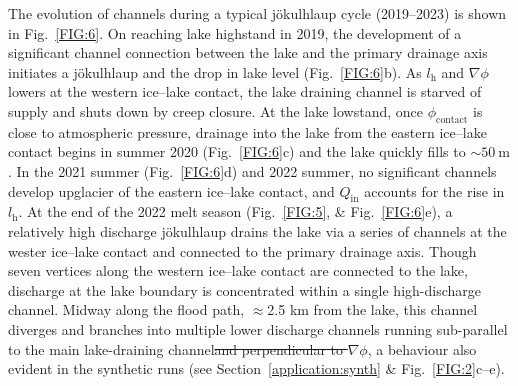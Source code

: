 \documentclass[tc, manuscript]{copernicus}
\providecommand{\DIFdel}[1]{{\protect\color{red}\sout{#1}}} %
\providecommand{\DIFdelbegin}{} %
\providecommand{\DIFdelend}{} %
\begin{document}
The evolution of channels during a typical jökulhlaup cycle (2019--2023) is shown in Fig.~\ref{FIG:6}. On reaching lake highstand in 2019, the development of a significant channel connection between the lake and the primary drainage axis initiates a jökulhlaup and the drop in lake level (Fig.~\ref{FIG:6}b). As $l_{\mathrm{h}}$ and $\nabla\phi$ lowers at the western ice--lake contact, the lake draining channel is starved of supply and shuts down by creep closure. At the lake lowstand, once $\phi_{\mathrm{contact}}$ is close to atmospheric pressure, drainage into the lake from the eastern ice--lake contact begins in summer 2020 (Fig.~\ref{FIG:6}c) and the lake quickly fills to $\sim 50\ \mathrm{m}$. In the 2021 summer (Fig.~\ref{FIG:6}d) and 2022 summer, no significant channels develop upglacier of the eastern ice--lake contact, and $Q_{\mathrm{in}}$ accounts for the rise in $l_{\mathrm{h}}$. At the end of the 2022 melt season (Fig.~\ref{FIG:5}, \& Fig.~\ref{FIG:6}e), a relatively high discharge jökulhlaup drains the lake via a series of channels at the wester ice--lake contact and connected to the primary drainage axis. Though seven vertices along the western ice--lake contact are connected to the lake, discharge at the lake boundary is concentrated within a single high-discharge channel. Midway along the flood path, $\approx$2.5 km from the lake, this channel diverges and branches into multiple lower discharge channels running sub-parallel to the main lake-draining channel\DIFdelbegin \DIFdel{and perpendicular to $\nabla \phi$}\DIFdelend , a behaviour also evident in the synthetic runs (see Section~\ref{application:synth} \& Fig.~\ref{FIG:2}c--e). 
\end{document}
